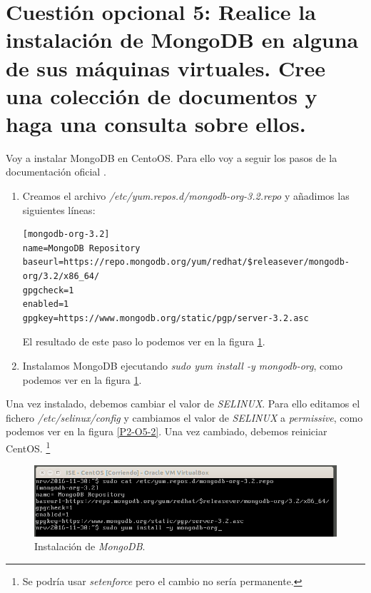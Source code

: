 \documentclass[a4paper,titlepage,12pt]{report}	%
\numberwithin{figure}{section} %
\numberwithin{table}{section} %
\begin{document}
	\section[Cuestión opcional 5: Realice la instalación de MongoDB en alguna de sus máquinas virtuales. Cree una colección de documentos y haga una consulta sobre ellos.]{Cuestión opcional 5: Realice la instalación de MongoDB en alguna de sus máquinas virtuales. Cree una colección de documentos y haga una consulta sobre ellos.}

	Voy a instalar MongoDB en CentoOS. Para ello voy a seguir los pasos de la documentación oficial \cite{mongodb}.
	\begin{enumerate}
		\item Creamos el archivo \textit{/etc/yum.repos.d/mongodb-org-3.2.repo} y añadimos las siguientes líneas:
		\begin{lstlisting}[breaklines=true, frame=single, xleftmargin=0.5cm, basicstyle=\footnotesize]
[mongodb-org-3.2]
name=MongoDB Repository
baseurl=https://repo.mongodb.org/yum/redhat/$releasever/mongodb-org/3.2/x86_64/
gpgcheck=1
enabled=1
gpgkey=https://www.mongodb.org/static/pgp/server-3.2.asc
		\end{lstlisting}
		El resultado de este paso lo podemos ver en la figura \ref{P2-O5-1}.
		\item Instalamos MongoDB ejecutando \textit{sudo yum install -y mongodb-org}, como podemos ver en la figura \ref{P2-O5-1}.
	\end{enumerate}

	Una vez instalado, debemos cambiar el valor de \textit{SELINUX}. Para ello editamos el fichero \textit{/etc/selinux/config} y cambiamos el valor de \textit{SELINUX} a \textit{permissive}, como podemos ver en la figura \ref{P2-O5-2}. Una vez cambiado, debemos reiniciar CentOS. \footnote{Se podría usar \textit{setenforce} pero el cambio no sería permanente.}

	\begin{figure}[H]
		\includegraphics[width=\linewidth]{./Imagenes/P2/O5-1.png}
		\vspace{-0.5cm}
		\caption[Instalación de \textit{MongoDB}.]{Instalación de \textit{MongoDB}.}
		\label{P2-O5-1}
	\end{figure}
\end{document}
